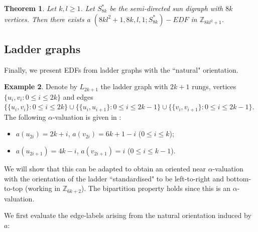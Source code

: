 \documentclass[12pt, a4paper]{article}
\newtheorem{theorem}{Theorem}[section]
\theoremstyle{definition}
\newtheorem{example}[theorem]{Example}
\begin{document}
\begin{theorem}
    Let $k,l \geq 1$. Let $S_{8k}^*$ be the semi-directed sun digraph with $8k$ vertices. Then there exists a $(8kl^2+1,8k,l,1;S_{8k}^*)-EDF$ in $\mathbb{Z}_{8kl^2+1}$.
\end{theorem}

\subsection{Ladder graphs}
Finally, we present EDFs from ladder graphs with the ``natural" orientation.

\begin{example}
Denote by $L_{2k+1}$ the ladder graph with $2k+1$ rungs, vertices $\{u_i,v_i: 0 \leq i \leq 2k\}$ and edges $\{\{u_i,v_i\}: 0 \leq i \leq 2k\}\cup \{\{u_i,u_{i+1}\}: 0 \leq i \leq 2k-1\}\cup \{\{v_i,v_{i+1}\}: 0 \leq i \leq 2k-1\}$. 
The following $\alpha$-valuation is given in \cite{Maheo}:
\begin{itemize}
\item $a(u_{2i})=2k+i$, $a(v_{2i})=6k+1-i$  ($0 \leq i \leq k$);
\item $a(u_{2i+1})=4k-i$, $a(v_{2i+1})=i$ ($0 \leq i \leq k-1$).
\end{itemize}
We will show that this can be adapted to obtain an oriented near $\alpha$-valuation with the orientation of the ladder ``standardised" to be left-to-right and bottom-to-top (working in $\mathbb{Z}_{6k+2}$). The bipartition property holds since this is an $\alpha$-valuation.

We first evaluate the edge-labels arising from the natural orientation induced by $a$:
    \begin{center}
\end{center}
\end{example}
\end{document}

